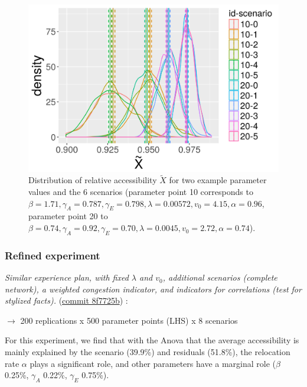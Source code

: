 \begin{figure}
	\includegraphics[width=\textwidth]{figures/20180417_184334_SPACEMATTERS_distrib_relativeAccessibility.png}
	\caption{Distribution of relative accessibility $\tilde{X}$ for two example parameter values and the 6 scenarios (parameter point 10 corresponds to $\beta = 1.71,\gamma_A=0.787,\gamma_E=0.798,\lambda=0.00572,v_0=4.15,\alpha=0.96$, parameter point 20 to $\beta = 0.74,\gamma_A=0.92,\gamma_E=0.70,\lambda=0.0045,v_0=2.72,\alpha=0.74$).\label{fig:distrib-access}}
\end{figure}



\subsubsection{Refined experiment}

\textit{Similar experience plan, with fixed $\lambda$ and $v_0$, additional scenarios (complete network), a weighted congestion indicator, and indicators for correlations (test for stylized facts).} (\href{https://github.com/JusteRaimbault/Governance/commit/8f7725b982bfb3bce51a58fbd516d690556abf89}{commit 8f7725b}) :

$\rightarrow$ 200 replications x 500 parameter points (LHS) x 8 scenarios


For this experiment, we find that with the Anova that the average accessibility is mainly explained by the scenario (39.9\%) and residuals (51.8\%), the relocation rate $\alpha$ plays a significant role, and other parameters have a marginal role ($\beta$ 0.25\%, $\gamma_A$ 0.22\%, $\gamma_E$ 0.75\%).


